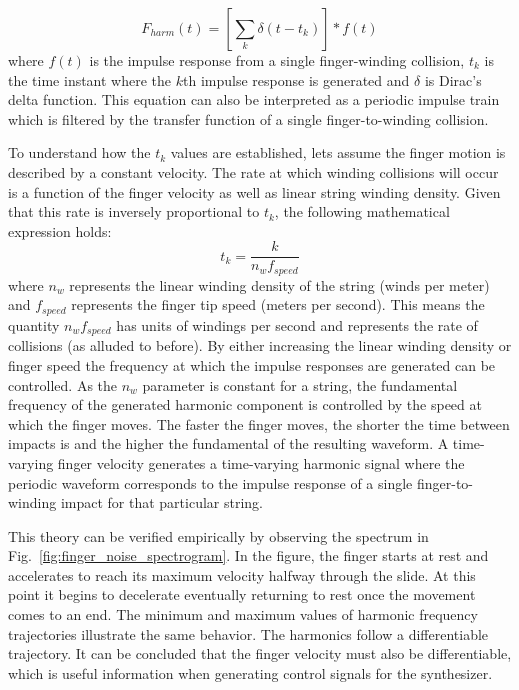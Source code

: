 \documentclass[main.tex]{subfiles}
\begin{document}
\begin{equation}
    F_{harm}(t) = \left[\sum_k \delta(t-t_k)\right] \ast f(t)
    \label{eqn:harmonic_force}
\end{equation}
where $f(t)$ is the impulse response from a single finger-winding collision, $t_k$ is the time instant where the $k$th impulse response is generated and $\delta$ is Dirac's delta function. This equation can also be interpreted as a periodic impulse train which is filtered by the transfer function of a single finger-to-winding collision.

To understand how the $t_k$ values are established, lets assume the finger motion is described by a constant velocity. The rate at which winding collisions will occur is a function of the finger velocity as well as linear string winding density. Given that this rate is inversely proportional to $t_k$, the following mathematical expression holds:
\begin{equation}
    t_k = \frac{k}{n_w f_{speed}}
    \label{eqn:t_k}
\end{equation}
where $n_w$ represents the linear winding density of the string (winds per meter) and $f_{speed}$ represents the finger tip speed (meters per second). This means the quantity $n_w f_{speed}$ has units of windings per second and represents the rate of collisions (as alluded to before). By either increasing the linear winding density or finger speed the frequency at which the impulse responses are generated can be controlled. As the $n_w$ parameter is constant for a string, the fundamental frequency of the generated harmonic component is controlled by the speed at which the finger moves. The faster the finger moves, the shorter the time between impacts is and the higher the fundamental of the resulting waveform. A time-varying finger velocity generates a time-varying harmonic signal where the periodic waveform corresponds to the impulse response of a single finger-to-winding impact for that particular string.

This theory can be verified empirically by observing the spectrum in Fig.~\ref{fig:finger_noise_spectrogram}. In the figure, the finger starts at rest and accelerates to reach its maximum velocity halfway through the slide. At this point it begins to decelerate eventually returning to rest once the movement comes to an end. The minimum and maximum values of harmonic frequency trajectories illustrate the same behavior. The harmonics follow a differentiable trajectory. It can be concluded that the finger velocity must also be differentiable, which is useful information when generating control signals for the synthesizer. 
\end{document}
